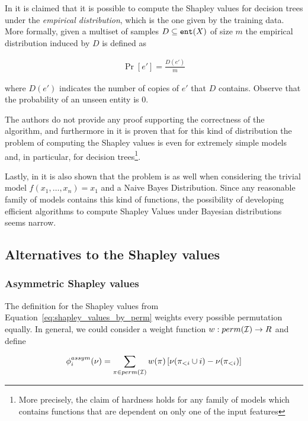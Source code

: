 In \cite{lundberg2020local} it is claimed that it is possible to compute the Shapley values for decision trees under the \textit{empirical distribution}, which is the one given by the training data. More formally, given a multiset of samples $D \subseteq \texttt{ent}(X)$ of size $m$ the empirical distribution induced by $D$ is defined as

\begin{align*}
    \Pr[e'] = \frac{D(e')}{m} 
\end{align*}

where $D(e')$ indicates the number of copies of $e'$ that $D$ contains. Observe that the probability of an unseen entity is 0.

The authors do not provide any proof supporting the correctness of the algorithm, and furthermore in \cite{van2022tractability} it is proven that for this kind of distribution the problem of computing the Shapley values is \sharpPhard{} even for extremely simple models and, in particular, for decision trees\footnote{More precisely, the claim of hardness holds for any family of models which contains functions that are dependent on only one of the input features}.

Lastly, in \cite{van2022tractability} it is also shown that the problem is \sharpPhard{} as well when considering the trivial model $f(x_1,\ldots,x_n) = x_1$ and a Naive Bayes Distribution. Since any reasonable family of models contains this kind of functions, the possibility of developing efficient algorithms to compute Shapley Values under Bayesian distributions seems narrow.


\subsection{Alternatives to the Shapley values}

\subsubsection{Asymmetric Shapley values}

The definition for the Shapley values from Equation~\ref{eq:shapley_values_by_perm} weights every possible permutation equally. In general, we could consider a weight function $w:perm(\mathcal{I}) \to R$ and define

\begin{align}\label{eq:assymetric_shap_def}
   \phi_{i}^{assym}(\nu) = \sum_{\pi \in perm(\mathcal{I})} w(\pi) \left[ \nu(\pi_{<i} \cup {i}) - \nu(\pi_{<i}) \right] 
\end{align}

